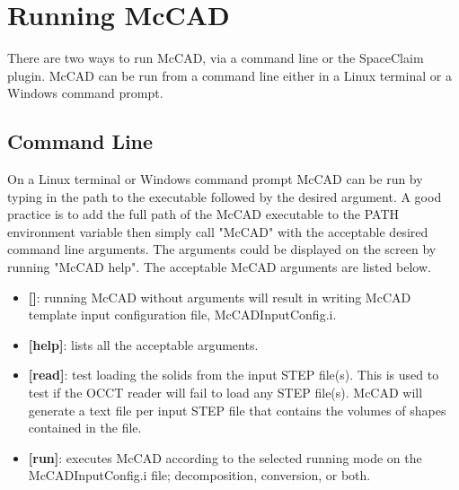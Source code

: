 \documentclass[12pt, a4paper, titlepage]{article}
\begin{document}
\section{Running McCAD} \label{sec:Running McCAD}
There are two ways to run McCAD, via a command line or the SpaceClaim plugin. McCAD can be run from a command line either in a Linux terminal or a Windows command prompt.

  \subsection{Command Line}
    On a Linux terminal or Windows command prompt McCAD can be run by typing in the path to the executable followed by the desired argument. A good practice is to add the full path of the McCAD executable to the PATH environment variable then simply call "McCAD" with the acceptable desired command line arguments. The arguments could be displayed on the screen by running "McCAD help". The acceptable McCAD arguments are listed below.
    \begin{itemize}
      \item \textbf{[]}: running McCAD without arguments will result in writing McCAD template input configuration file, McCADInputConfig.i.
      \item \textbf{[help]}: lists all the acceptable arguments.
      \item \textbf{[read]}: test loading the solids from the input STEP file(s). This is used to test if the OCCT reader will fail to load any STEP file(s). McCAD will generate a text file per input STEP file that contains the volumes of shapes contained in the file.
      \item \textbf{[run]}: executes McCAD according to the selected running mode on the McCADInputConfig.i file; decomposition, conversion, or both. 
    \end{itemize}
\end{document}
